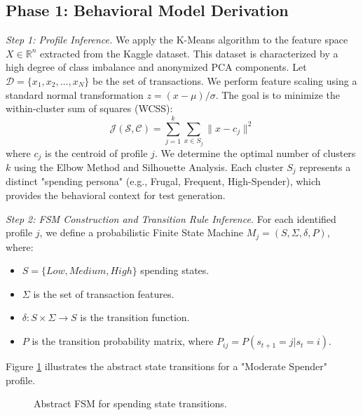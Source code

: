 \documentclass[review]{elsarticle}
\begin{document}
\subsection{Phase 1: Behavioral Model Derivation}
\textit{Step 1: Profile Inference.} We apply the K-Means algorithm to the feature space $X \in \mathbb{R}^n$ extracted from the Kaggle dataset. This dataset is characterized by a high degree of class imbalance and anonymized PCA components. Let $\mathcal{D} = \{x_1, x_2, \dots, x_N\}$ be the set of transactions. We perform feature scaling using a standard normal transformation $z = (x - \mu) / \sigma$. The goal is to minimize the within-cluster sum of squares (WCSS):
\begin{equation}
    \mathcal{J}(\mathcal{S}, \mathcal{C}) = \sum_{j=1}^{k} \sum_{x \in S_j} \| x - c_j \|^2
\end{equation}
where $c_j$ is the centroid of profile $j$. We determine the optimal number of clusters $k$ using the Elbow Method and Silhouette Analysis. Each cluster $S_j$ represents a distinct "spending persona" (e.g., Frugal, Frequent, High-Spender), which provides the behavioral context for test generation.

\textit{Step 2: FSM Construction and Transition Rule Inference.} For each identified profile $j$, we define a probabilistic Finite State Machine $M_j = (S, \Sigma, \delta, P)$, where:
\begin{itemize}
    \item $S = \{Low, Medium, High\}$ spending states.
    \item $\Sigma$ is the set of transaction features.
    \item $\delta: S \times \Sigma \to S$ is the transition function.
    \item $P$ is the transition probability matrix, where $P_{ij} = P(s_{t+1}=j | s_t=i)$.
\end{itemize}

Figure \ref{fig:fsm} illustrates the abstract state transitions for a "Moderate Spender" profile.

\begin{figure}[h]
\centering
{}
\caption{Abstract FSM for spending state transitions.}
\label{fig:fsm}
\end{figure}
\end{document}

